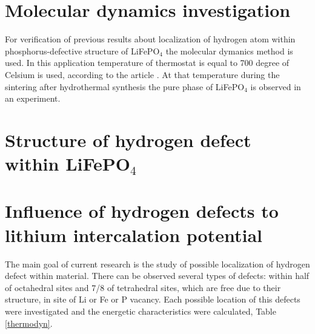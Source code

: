 \newpage

\section{Molecular dynamics investigation}

For verification of previous results about localization of hydrogen atom within phosphorus-defective structure of LiFePO$_{4}$ the molecular dymanics method is used. In this application temperature of thermostat is equal to 700 degree of Celsium is used, according to the article \cite{synthesis}. At that temperature during the sintering after hydrothermal synthesis the pure phase of LiFePO$_{4}$
is observed in an experiment. 

\section{Structure of hydrogen defect within LiFePO$_{4}$}

\newpage

\section{Influence of hydrogen defects to lithium intercalation potential}



The main goal of current research is the study of possible localization of hydrogen defect within material. There can be observed several types of defects: within half of octahedral sites and 7/8 of tetrahedral sites, which are free due to their structure, in site of Li or Fe or P vacancy. Each possible location of this defects were investigated and the energetic characteristics were calculated, Table \ref{thermodyn}.


